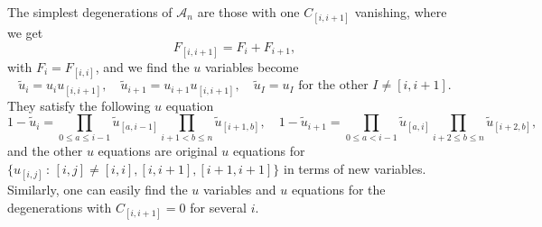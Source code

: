 \documentclass[hidelinks,12pt]{article}
\begin{document}
The simplest degenerations of $\mathscr A_n$ are those with one $C_{[i,i+1]}$ vanishing, where we get 
\[
	F_{[i,i+1]}=F_{i}+F_{i+1},
\]
with $F_i=F_{[i,i]}$, and we find the $u$ variables become
\[
	\tilde u_{i}=u_{i} u_{[i,i+1]},\quad 
	\tilde u_{i+1}=u_{i+1} u_{[i,i+1]},\quad 
	\tilde u_I=u_I \text{ for the other $I\neq [i,i+1]$}.
\]
They satisfy the following $u$ equation
\begin{equation}
	1-\tilde u_{i}=\prod_{0\leq a\leq i-1}\tilde u_{[a,i-1]}
	\prod_{i+1< b\leq n} \tilde u_{[i+1,b]},\quad 
	1-\tilde u_{i+1}=\prod_{0\leq a <i-1} \tilde u_{[a,i]}
	\prod_{i+2\leq b\leq n} \tilde u_{[i+2,b]},\quad 
\end{equation}
and the other $u$ equations are original $u$ equations for $\{u_{[i,j]}\,:\, [i,j]\neq [i,i],[i,i+1],[i+1,i+1]\}$ in terms of new variables. Similarly, one can easily find the $u$ variables and $u$ equations for the degenerations with $C_{[i,i+1]}=0$ for several $i$.

\end{document}
